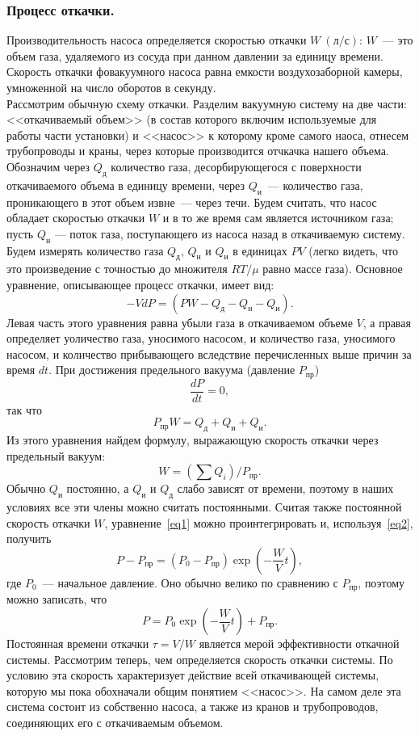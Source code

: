 \documentclass[a4paper,11pt]{article}
\begin{document}
\subsubsection{Процесс откачки.}
Производительность насоса определяется скоростью откачки $W\ (л/с)$: $W$~--- это объем газа, удаляемого из сосуда при данном давлении за единицу времени. Скорость откачки фовакуумного насоса равна емкости воздухозаборной камеры, умноженной на число оборотов в секунду.\\
Рассмотрим обычную схему откачки. Разделим вакуумную систему на две части: <<откачиваемый объем>> (в состав которого включим используемые для работы части установки) и <<насос>> к которому кроме самого наоса, отнесем трубопроводы и краны, через которые производится отчкачка нашего объема. Обозначим через $Q_{д}$ количество газа, десорбирующегося с поверхности откачиваемого объема в единицу времени, через $Q_{и}$~--- количество газа, проникающего в этот объем извне~--- через течи. Будем считать, что насос обладает скоростью откачки $W$ и в то же время сам является источником газа; пусть $Q_{н}$ — поток газа, поступающего из насоса назад в откачиваемую систему. Будем измерять количество газа $Q_{д}$, $Q_{н}$ и $Q_{и}$ в единицах $PV$ (легко видеть, что это произведение с точностью до множителя $RT/\mu$ равно массе газа). Основное уравнение, описывающее процесс откачки, имеет вид:
\begin{equation}    \label{eq1}
  -VdP = \left(PW - Q_{д} - Q_{н} - Q_{и}\right).
\end{equation}
Левая часть этого уравнения равна убыли газа в откачиваемом объеме $V$, а правая определяет уоличество газа, уносимого насосом, и количество газа, уносимого насосом, и количество прибывающего вследствие перечисленных выше причин за время $dt$. При достижения предельного вакуума (давление $P_{пр}$)
$$\frac{dP}{dt}=0,$$
так что
\begin{equation}    \label{eq2}
  P_{пр}W = Q_{д} + Q_{и} + Q_{и}.
\end{equation}
Из этого уравнения найдем формулу, выражающую скорость откачки через предельный вакуум:
$$W =\left(\sum Q_{i}\right)/P_{пр}.$$
Обычно $Q_{и}$ постоянно, а $Q_{и}$ и $Q_{д}$ слабо зависят от времени, поэтому в наших условиях все эти члены можно считать постоянными. Считая также постоянной скорость откачки $W$, уравнение~\ref{eq1} можно проинтегрировать и, используя~\ref{eq2}, получить
\begin{equation}    \label{eq3}
  P - P_{пр} = \left(P_{0} - P_{пр}\right) \exp \left(-\frac{W}{V} t\right),
\end{equation}
где $P_{0}$~--- начальное давление. Оно обычно велико по сравнению с $P_{пр}$, поэтому можно записать, что
\begin{equation}    \label{eq4}
  P = P_{0} \exp \left(-\frac{W}{V} t\right) + P_{пр}.
\end{equation}
Постоянная времени откачки $\tau = V/W$ является мерой эффективности откачной системы.
Рассмотрим теперь, чем определяется скорость откачки системы. По условию эта скорость характеризует действие всей откачивающей системы, которую мы пока обохначали общим понятием <<насос>>. На самом деле эта система состоит из собственно насоса, а также из кранов и трубопроводов, соединяющих его с откачиваемым объемом.
\end{document}
